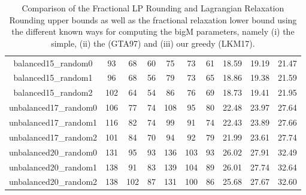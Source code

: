 \begin{table}
\begin{adjustbox}{center}
\begin{tabular}{|cccccccccc|}
balanced15\_random0 & 93 & 68 & 60 & 75 & 73 & 61 & 18.59 & 19.19 & 21.47 \\ 
balanced15\_random1 & 96 & 68 & 56 & 79 & 73 & 65 & 18.86 & 19.38 & 21.59 \\ 
balanced15\_random2 & 102 & 64 & 54 & 86 & 76 & 69 & 18.73 & 19.41 & 21.95 \\ 
unbalanced17\_random0 & 106 & 77 & 74 & 108 & 95 & 80 & 22.48 & 23.97 & 27.64 \\ 
unbalanced17\_random1 & 116 & 82 & 74 & 99 & 91 & 74 & 22.43 & 23.89 & 27.66 \\ 
unbalanced17\_random2 & 101 & 84 & 70 & 94 & 92 & 79 & 21.99 & 23.61 & 27.74 \\ 
unbalanced20\_random0 & 131 & 95 & 93 & 136 & 103 & 93 & 26.02 & 27.91 & 32.49 \\ 
unbalanced20\_random1 & 138 & 91 & 83 & 139 & 104 & 89 & 26.01 & 27.74 & 32.64 \\ 
unbalanced20\_random2 & 138 & 102 & 87 & 131 & 100 & 86 & 25.68 & 27.67 & 32.60 \\ 
\hline 
\end{tabular} 
\end{adjustbox} 
\vspace*{-0.2cm} 
\caption{Comparison of the Fractional LP Rounding and Lagrangian Relaxation Rounding upper bounds as well as the fractional relaxation lower bound using the different known ways for computing the bigM parameters, namely (i) the simple, (ii) the \citet{gundersen:1997} (GTA97) and (iii) our greedy (LKM17).} 
\label{Table:BigM_Comparisons} 
\end{table} 

